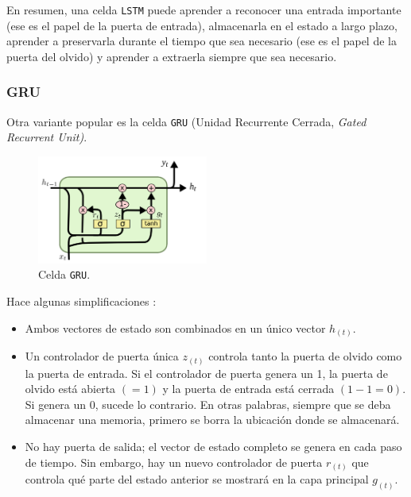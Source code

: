 \documentclass[a4paper,12pt]{article}
\begin{document}
En resumen, una celda \texttt{LSTM} puede aprender a reconocer una entrada importante (ese es el papel de la puerta de entrada), almacenarla en el estado a largo plazo, aprender a preservarla durante el tiempo que sea necesario (ese es el papel de la puerta del olvido) y aprender a extraerla siempre que sea necesario.

\subsubsection{GRU}

Otra variante popular es la celda \texttt{GRU} (Unidad Recurrente Cerrada, \textit{Gated Recurrent Unit)}. \citep{olahlstm}

\begin{figure}[H]
	\begin{center}				
	\includegraphics[width=0.5\textwidth]{gru2.png}
  	\caption{Celda \texttt{GRU}.}
  	\label{fig:lstm5}
  	\end{center}
\end{figure}

Hace algunas simplificaciones \citep{geron}:

\begin{itemize}
	\item Ambos vectores de estado son combinados en un único vector $h_{(t)}$.
	\item Un controlador de puerta única $z_{(t)}$ controla tanto la puerta de olvido como la puerta de entrada. Si el controlador de puerta genera un 1, la puerta de olvido está abierta $(=1)$ y la puerta de entrada está cerrada $(1-1=0)$. Si genera un 0, sucede lo contrario. En otras palabras, siempre que se deba almacenar una memoria, primero se borra la ubicación donde se almacenará.
	\item No hay puerta de salida; el vector de estado completo se genera en cada paso de tiempo. Sin embargo, hay un nuevo controlador de puerta $r_{(t)}$ que controla qué parte del estado anterior se mostrará en la capa principal $g_{(t)}$.

\end{itemize}
\end{document}
